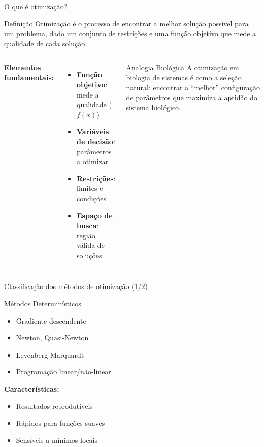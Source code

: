 \begin{frame}{O que é otimização?}
\begin{block}{Definição}
Otimização é o processo de encontrar a melhor solução possível para um problema, dado um conjunto de restrições e uma função objetivo que mede a qualidade de cada solução.
\end{block}

\vspace{0.4cm}

\begin{columns}
\textbf{Elementos fundamentais:}
\begin{itemize}
    \item \textbf{Função objetivo}: mede a qualidade ($f(x)$)
    \item \textbf{Variáveis de decisão}: parâmetros a otimizar
    \item \textbf{Restrições}: limites e condições
    \item \textbf{Espaço de busca}: região válida de soluções
\end{itemize}

\begin{exampleblock}{Analogia Biológica}
A otimização em biologia de sistemas é como a seleção natural: encontrar a ``melhor'' configuração de parâmetros que maximiza a aptidão do sistema biológico.
\end{exampleblock}
\end{columns}
\end{frame}

\begin{frame}{Classificação dos métodos de otimização (1/2)}
\begin{block}{Métodos Determinísticos}
\begin{itemize}
    \item Gradiente descendente
    \item Newton, Quasi-Newton
    \item Levenberg-Marquardt
    \item Programação linear/não-linear
\end{itemize}
\textbf{Características:}
\begin{itemize}
    \item Resultados reprodutíveis
    \item Rápidos para funções suaves
    \item Sensíveis a mínimos locais
\end{itemize}
\end{block}
\end{frame}


